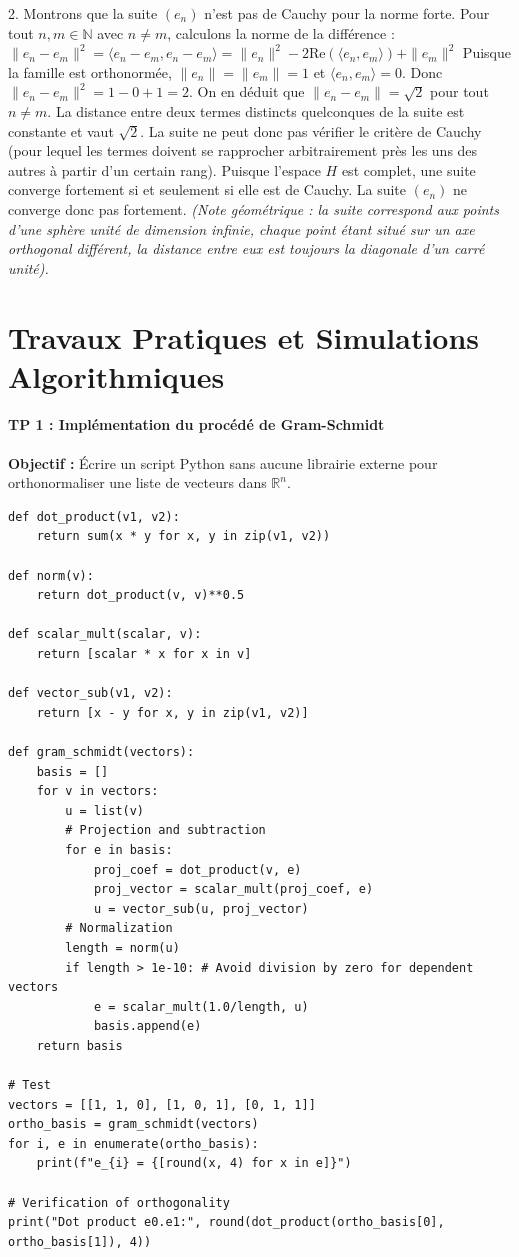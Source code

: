 \documentclass[11pt,a4paper]{article}
\begin{document}
2. Montrons que la suite $(e_n)$ n'est pas de Cauchy pour la norme forte.
   Pour tout $n, m \in \mathbb{N}$ avec $n \neq m$, calculons la norme de la différence :
   $\|e_n - e_m\|^2 = \langle e_n - e_m, e_n - e_m \rangle = \|e_n\|^2 - 2 \text{Re}(\langle e_n, e_m \rangle) + \|e_m\|^2$
   Puisque la famille est orthonormée, $\|e_n\| = \|e_m\| = 1$ et $\langle e_n, e_m \rangle = 0$.
   Donc $\|e_n - e_m\|^2 = 1 - 0 + 1 = 2$.
   On en déduit que $\|e_n - e_m\| = \sqrt{2}$ pour tout $n \neq m$.
   La distance entre deux termes distincts quelconques de la suite est constante et vaut $\sqrt{2}$. La suite ne peut donc pas vérifier le critère de Cauchy (pour lequel les termes doivent se rapprocher arbitrairement près les uns des autres à partir d'un certain rang).
   Puisque l'espace $H$ est complet, une suite converge fortement si et seulement si elle est de Cauchy. La suite $(e_n)$ ne converge donc pas fortement.
   \textit{(Note géométrique : la suite correspond aux points d'une sphère unité de dimension infinie, chaque point étant situé sur un axe orthogonal différent, la distance entre eux est toujours la diagonale d'un carré unité).}


\part{Travaux Pratiques et Simulations Algorithmiques}
\subsection*{TP 1 : Implémentation du procédé de Gram-Schmidt}

\textbf{Objectif :} Écrire un script Python sans aucune librairie externe pour orthonormaliser une liste de vecteurs dans $\mathbb{R}^n$.

\begin{lstlisting}
def dot_product(v1, v2):
    return sum(x * y for x, y in zip(v1, v2))

def norm(v):
    return dot_product(v, v)**0.5

def scalar_mult(scalar, v):
    return [scalar * x for x in v]

def vector_sub(v1, v2):
    return [x - y for x, y in zip(v1, v2)]

def gram_schmidt(vectors):
    basis = []
    for v in vectors:
        u = list(v)
        # Projection and subtraction
        for e in basis:
            proj_coef = dot_product(v, e)
            proj_vector = scalar_mult(proj_coef, e)
            u = vector_sub(u, proj_vector)
        # Normalization
        length = norm(u)
        if length > 1e-10: # Avoid division by zero for dependent vectors
            e = scalar_mult(1.0/length, u)
            basis.append(e)
    return basis

# Test
vectors = [[1, 1, 0], [1, 0, 1], [0, 1, 1]]
ortho_basis = gram_schmidt(vectors)
for i, e in enumerate(ortho_basis):
    print(f"e_{i} = {[round(x, 4) for x in e]}")

# Verification of orthogonality
print("Dot product e0.e1:", round(dot_product(ortho_basis[0], ortho_basis[1]), 4))
\end{lstlisting}
\end{document}
